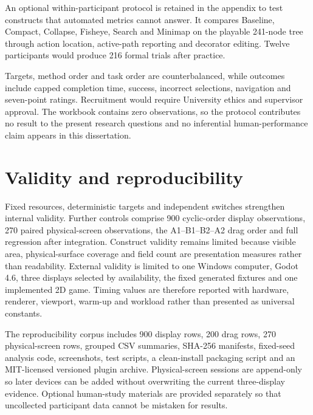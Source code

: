An optional within-participant protocol is retained in the appendix to test constructs that automated metrics cannot answer. It compares Baseline, Compact, Collapse, Fisheye, Search and Minimap on the playable 241-node tree through action location, active-path reporting and decorator editing. Twelve participants would produce 216 formal trials after practice.

Targets, method order and task order are counterbalanced, while outcomes include capped completion time, success, incorrect selections, navigation and seven-point ratings. Recruitment would require University ethics and supervisor approval. The workbook contains zero observations, so the protocol contributes no result to the present research questions and no inferential human-performance claim appears in this dissertation.

\section{Validity and reproducibility}

Fixed resources, deterministic targets and independent switches strengthen internal validity. Further controls comprise 900 cyclic-order display observations, 270 paired physical-screen observations, the A1--B1--B2--A2 drag order and full regression after integration. Construct validity remains limited because visible area, physical-surface coverage and field count are presentation measures rather than readability. External validity is limited to one Windows computer, Godot 4.6, three displays selected by availability, the fixed generated fixtures and one implemented 2D game. Timing values are therefore reported with hardware, renderer, viewport, warm-up and workload rather than presented as universal constants.

The reproducibility corpus includes 900 display rows, 200 drag rows, 270 physical-screen rows, grouped CSV summaries, SHA-256 manifests, fixed-seed analysis code, screenshots, test scripts, a clean-install packaging script and an MIT-licensed versioned plugin archive. Physical-screen sessions are append-only so later devices can be added without overwriting the current three-display evidence. Optional human-study materials are provided separately so that uncollected participant data cannot be mistaken for results.
